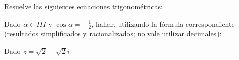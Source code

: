 \documentclass[spanish, 11pt]{exam}
\begin{document}
\begin{questions}



        

\addpoints

\question Resuelve las siguientes ecuaciones trigonométricas:

\question Dado $\alpha \in III$ y $\cos{\alpha}=-\frac{1}{2}$, hallar, utilizando la fórmula correspondiente (resultados simplificados y racionalizados; no vale utilizar decimales):
\begin{parts}
    \part[1] $\sen{2\alpha}$
\end{parts}

\question Dado $z=\sqrt{2}-\sqrt{2}i$
\end{questions}
\end{document}
